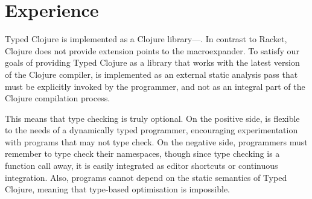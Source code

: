 \section{Experience}
\label{sec:experience}

Typed Clojure is implemented as a Clojure library---\coretyped{}.
In contrast to Racket, Clojure does not provide extension
points to the macroexpander. To satisfy our goals of providing
Typed Clojure as a library that works with the latest version of the Clojure
compiler, \coretyped{} is implemented as an external static analysis pass
that must be explicitly invoked by the programmer, and not as an
integral part of the Clojure compilation process. 

This means that type checking is truly optional. 
On the positive side, \coretyped{} is flexible to the needs of a dynamically
typed programmer, encouraging experimentation with programs that may not
type check.
On the negative side, programmers must remember to type check their namespaces,
though since type checking is a function call away, it is easily integrated as editor
shortcuts or continuous integration.
Also, programs cannot depend on the static semantics of Typed Clojure, meaning that
type-based optimisation is impossible. 

%
%

